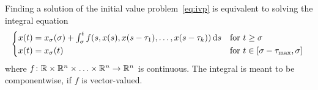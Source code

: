     \begin{lemma}\label{lm:integral-equation}
        Finding a solution of the initial value problem~\eqref{eq:ivp} is equivalent to solving the integral equation
        \begin{equation*}\label{eq:integral-equation}
            \normalfont
            \begin{cases*}
                x(t) = x_{\tzero}(\tzero) + \integral{\tzero}{t} f(s,x(s),x(s-\tau_1),\ldots,x(s-\tau_k))\dx[s] & for $t\geq\tzero$\\
                x(t) = x_{\tzero}(t) & for $t\in\compactum{\tzero-\taumax}{\tzero}$
            \end{cases*}
        \end{equation*}
        where $f\colon\mathbb{R}\times\mathbb{R}^n\times\ldots\times\mathbb{R}^n\to\mathbb{R}^n$ is continuous.
        The integral is meant to be componentwise, if $f$ is vector-valued.
    \end{lemma}

